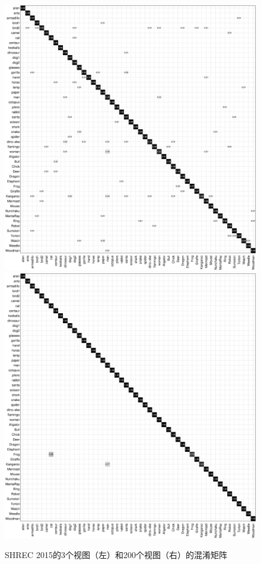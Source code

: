 \begin{figure}[tbhp]
\begin{center}
\includegraphics[width=0.45\linewidth]{figures/shrec2015_CM_3view.eps} 
\includegraphics[width=0.45\linewidth]{figures/shrec2015_CM_200view.eps}
\end{center} 
\vspace{-4mm}
\caption{SHREC 2015的3个视图（左）和200个视图（右）的混淆矩阵} \label{fig_cm_shrec2015}
\end{figure}



